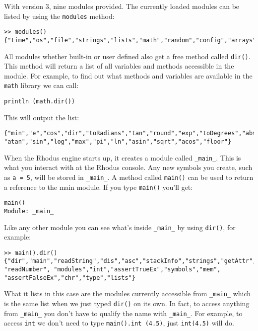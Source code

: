 With version 3, nine modules provided. The currently loaded modules can be listed by using the {\tt modules{}} method:

\begin{lstlisting}
>> modules()
{"time","os","file","strings","lists","math","random","config","arrays"}
\end{lstlisting}

All modules whether built-in or user defined also get a free method called {\tt dir()}. This method will return a list of all variables and methods accessible in the module. For example, to find out what methods and variables are available in the {\tt math} library we can call:

\begin{lstlisting}
println (math.dir())
\end{lstlisting}

This will output the list:

\begin{lstlisting}
{"min","e","cos","dir","toRadians","tan","round","exp","toDegrees","abs","ceil",
"atan","sin","log","max","pi","ln","asin","sqrt","acos","floor"}
\end{lstlisting}

When the Rhodus engine starts up, it creates a module called {\tt _main_}. This is what you interact with at the Rhodus console. Any new symbols you create, such as {\tt a = 5}, will be stored in {\tt _main_}.  A method called {\tt main()} can be used to return a reference to the main module. If you type {\tt main()} you'll get:

\begin{lstlisting}
main()
Module: _main_
\end{lstlisting}

Like any other module you can see what's inside {\tt _main_} by using {\tt dir()}, for example:

\begin{lstlisting}
>> main().dir()
{"dir","main","readString","dis","asc","stackInfo","strings","getAttr","os",
"readNumber", "modules","int","assertTrueEx","symbols","mem",
"assertFalseEx","chr","type","lists"}
\end{lstlisting}

What it lists in this case are the modules currently accessible from {\tt _main_} which is the same list when we just typed {\tt dir()} on its own. In fact, to access anything from {\tt _main_} you don't have to qualify the name with {\tt _main_}. For example, to access {\tt int} we don't need to type {\tt main().int (4.5)}, just {\tt int(4.5)} will do.

